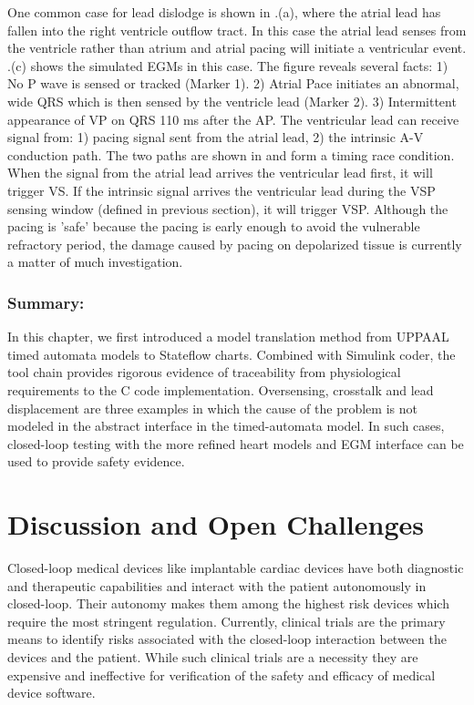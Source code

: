 One common case for lead dislodge is shown in .(a), where the atrial lead has fallen into the right ventricle outflow tract. In this case the atrial lead senses from the ventricle rather than atrium and atrial pacing will initiate a ventricular event. .(c) shows the simulated EGMs in this case. The figure reveals several facts: 1) No P wave is sensed or tracked (Marker 1). 2) Atrial Pace initiates an abnormal, wide QRS which is then sensed by the ventricle lead (Marker 2). 3) Intermittent appearance of VP on QRS 110 ms after the AP. The ventricular lead can receive signal from: 1) pacing signal sent from the atrial lead, 2) the intrinsic A-V conduction path. The two paths are shown in  and form a timing race condition. When the signal from the atrial lead arrives the ventricular lead first, it will trigger VS. If the intrinsic signal arrives the ventricular lead during the VSP sensing window (defined in previous section), it will trigger VSP. Although the pacing is 'safe' because the pacing is early enough to avoid the vulnerable refractory period, the damage caused by pacing on depolarized tissue is currently a matter of much investigation.\\

\subsection{Summary:}
In this chapter, we first introduced a model translation method from UPPAAL timed automata models to Stateflow charts. Combined with Simulink coder, the tool chain provides rigorous evidence of traceability from physiological requirements to the C code implementation. Oversensing, crosstalk and lead displacement are three examples in which the cause of the problem is not modeled in the abstract interface in the timed-automata model. In such cases, closed-loop testing with the more refined heart models and EGM interface can be used to provide safety evidence.

\chapter{Discussion and Open Challenges}
Closed-loop medical devices like implantable cardiac devices have both diagnostic and therapeutic capabilities and interact with the patient autonomously in closed-loop. Their autonomy makes them among the highest risk devices which require the most stringent regulation. Currently, clinical trials are the primary means to identify risks associated with the closed-loop interaction between the devices and the patient. While such clinical trials are a necessity they are expensive and ineffective for verification of the safety and efficacy of medical device software. 

